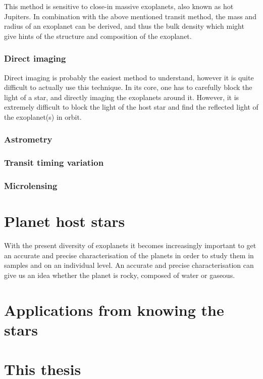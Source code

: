 This method is sensitive to close-in massive exoplanets, also known as hot Jupiters. In combination
with the above mentioned transit method, the mass and radius of an exoplanet can be derived, and
thus the bulk density which might give hints of the structure and composition of the exoplanet.


\subsubsection{Direct imaging}

Direct imaging is probably the easiest method to understand, however it is quite difficult to
actually use this technique. In its core, one has to carefully block the light of a star, and
directly imaging the exoplanets around it. However, it is extremely difficult to block the light of
the host star and find the reflected light of the exoplanet(s) in orbit.



\subsubsection{Astrometry}



\subsubsection{Transit timing variation}



\subsubsection{Microlensing}




\section{Planet host stars}
\label{sec:planet_host_stars}

With the present diversity of exoplanets it becomes increasingly important to get an accurate and
precise characterisation of the planets in order to study them in samples and on an individual
level. An accurate and precise characterisation can give us an idea whether the planet is rocky,
composed of water or gaseous.



\section{Applications from knowing the stars}
\label{sec:stars_application}





\section{This thesis}
\label{sec:this_thesis}

